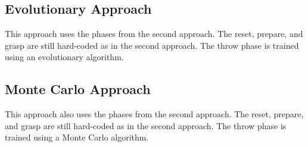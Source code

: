 \documentclass[10pt,twocolumn,letterpaper]{article}
\begin{document}
\subsection{Evolutionary Approach} \label{subsec:EA}

This approach uses the phases from the second approach. The reset, prepare, and grasp are still hard-coded as in the second approach. The throw phase is trained using an evolutionary algorithm. 

\subsection{Monte Carlo Approach} \label{subsec:MC}

This approach also uses the phases from the second approach. The reset, prepare, and grasp are still hard-coded as in the second approach. The throw phase is trained using a Monte Carlo algorithm. 

{\small


}
\end{document}
